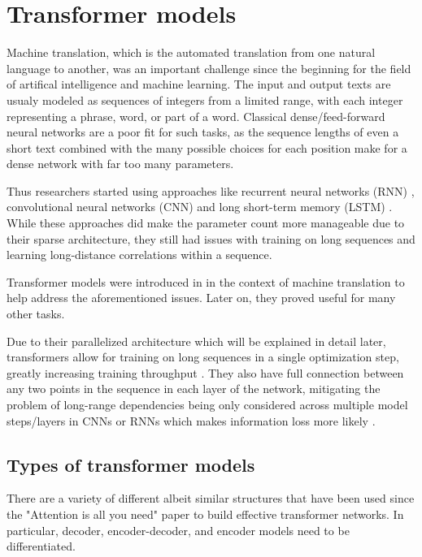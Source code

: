 \section{Transformer models}

Machine translation, which is the automated translation from one natural language to another, was an important challenge since the beginning for the field of artifical intelligence and machine learning.
The input and output texts are usualy modeled as sequences of integers from a limited range, with each integer representing a phrase, word, or part of a word.
Classical dense/feed-forward neural networks are a poor fit for such tasks, as the sequence lengths of even a short text combined with the many possible choices for each position make for a dense network with far too many parameters.

Thus researchers started using approaches like recurrent neural networks (RNN) \cite{phrasereps}, convolutional neural networks (CNN) \cite{convseq} and long short-term memory (LSTM) \cite{seq2seq}.
While these approaches did make the parameter count more manageable due to their sparse architecture, they still had issues with training on long sequences and learning long-distance correlations within a sequence.

Transformer models were introduced in \cite{allyouneed} in the context of machine translation to help address the aforementioned issues. Later on, they proved useful for many other tasks. 

Due to their parallelized architecture which will be explained in detail later, transformers allow for training on long sequences in a single optimization step, greatly increasing training throughput . They also have full connection between any two points in the sequence in each layer of the network, mitigating the problem of long-range dependencies being only considered across multiple model steps/layers in CNNs or RNNs which makes information loss more likely .

\subsection{Types of transformer models}

There are a variety of different albeit similar structures that have been used since the "Attention is all you need" paper to build effective transformer networks. In particular, decoder, encoder-decoder, and encoder models need to be differentiated.

